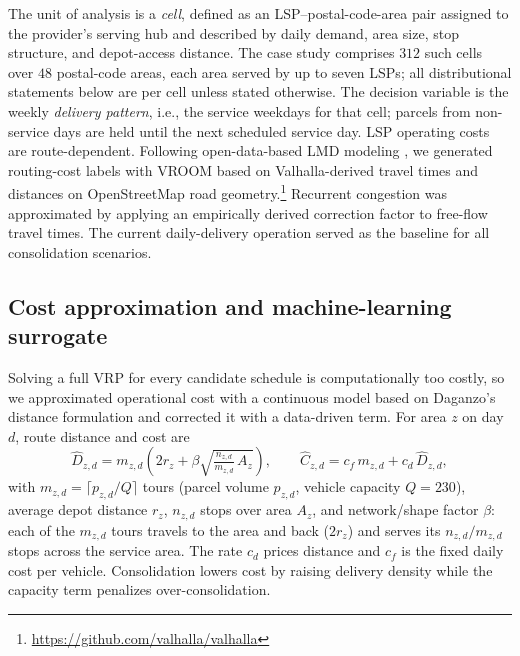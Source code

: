 \documentclass[preprint,12pt,authoryear]{elsarticle}
\begin{document}
The unit of analysis is a \emph{cell}, defined as an LSP--postal-code-area pair assigned to the provider's serving hub and described by daily demand, area size, stop structure, and depot-access distance. The case study comprises $312$ such cells over $48$ postal-code areas, each area served by up to seven LSPs; all distributional statements below are per cell unless stated otherwise. The decision variable is the weekly \emph{delivery pattern}, i.e., the service weekdays for that cell; parcels from non-service days are held until the next scheduled service day. LSP operating costs are route-dependent. Following open-data-based LMD modeling \citep{HORL2025104893}, we generated routing-cost labels with VROOM \citep{vroom_v1.14} based on Valhalla-derived travel times and distances on OpenStreetMap road geometry.\footnote{\url{https://github.com/valhalla/valhalla}} Recurrent congestion was approximated by applying an empirically derived correction factor to free-flow travel times. The current daily-delivery operation served as the baseline for all consolidation scenarios.







\subsection{Cost approximation and machine-learning surrogate}
\label{sec:cost_model}

Solving a full VRP for every candidate schedule is computationally too costly, so we approximated operational cost with a continuous model based on Daganzo's distance formulation \citep{Daganzo84} and corrected it with a data-driven term. For area $z$ on day $d$, route distance and cost are
\begin{equation}
\label{eq:daganzo}
\hat{D}_{z,d} = m_{z,d}\!\left( 2 r_z + \beta\sqrt{\tfrac{n_{z,d}}{m_{z,d}}\, A_z} \right), \qquad
\hat{C}_{z,d} = c_f\, m_{z,d} + c_d\, \hat{D}_{z,d},
\end{equation}
with $m_{z,d}=\lceil p_{z,d}/Q\rceil$ tours (parcel volume $p_{z,d}$, vehicle capacity $Q = 230$), average depot distance $r_z$, $n_{z,d}$ stops over area $A_z$, and network/shape factor $\beta$: each of the $m_{z,d}$ tours travels to the area and back ($2r_z$) and serves its $n_{z,d}/m_{z,d}$ stops across the service area. The rate $c_d$ prices distance and $c_f$ is the fixed daily cost per vehicle. Consolidation lowers cost by raising delivery density while the capacity term penalizes over-consolidation.
\end{document}
